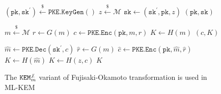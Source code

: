 \documentclass[journal=tches,submission]{iacrtrans}
\newcommand{\keygen}{\texttt{KeyGen}}
\newcommand{\kem}{\texttt{KEM}}
\newcommand{\encap}{\texttt{Encap}}
\newcommand{\decap}{\texttt{Decap}}
\newcommand{\pk}{\texttt{pk}}
\newcommand{\sk}{\texttt{sk}}
\newcommand{\leftsample}{\stackrel{\$}{\leftarrow}}
\begin{document}
\begin{figure}[h]
    \centering

    \begin{minipage}[t]{0.34\textwidth}
        \begin{algorithm}[H]
            \caption*{$\kem^{\not\bot}_m.\keygen()$}
            \begin{algorithmic}[1]
                \State $(\pk, \sk^\prime) \leftsample \texttt{PKE.KeyGen}()$
                \State $z \leftsample \mathcal{M}$
                \State $\sk \leftarrow (\sk^\prime, \pk, z)$
                \State \Return $(\pk, \sk)$
            \end{algorithmic}
        \end{algorithm}
    \end{minipage}
    \begin{minipage}[t]{0.3\textwidth}
        \begin{algorithm}[H]
            \caption*{$\kem^{\not\bot}_m.\encap(\pk)$}
            \begin{algorithmic}[1]
                \State $m \leftsample \mathcal{M}$
                \State $r \leftarrow G(m)$
                \State $c \leftarrow \texttt{PKE.Enc}(\pk, m ,r)$
                \State $K \leftarrow H(m)$
                \State \Return $(c, K)$
            \end{algorithmic}
        \end{algorithm}
    \end{minipage}
    \begin{minipage}[t]{0.3\textwidth}
        \begin{algorithm}[H]
            \caption*{$\kem^{\not\bot}_m.\decap(\sk, c)$}
            \begin{algorithmic}[1]
                \State $\hat{m} \leftarrow \texttt{PKE.Dec}(\sk^\prime, c)$
                \State $\hat{r} \leftarrow G(m)$
                \State $\hat{c} \leftarrow \texttt{PKE.Enc}(\pk, \hat{m}, \hat{r})$
                    \State $K \leftarrow H(\hat{m})$
                \Else
                    \State $K \leftarrow H(z, c)$
                \EndIf
                \State \Return $K$
            \end{algorithmic}
        \end{algorithm}
    \end{minipage}

    \caption{The $\kem^{\not\bot}_m$ variant of Fujisaki-Okamoto transformation is used in ML-KEM}\label{fig:u-notbot-m-routines}
\end{figure}
\end{document}
